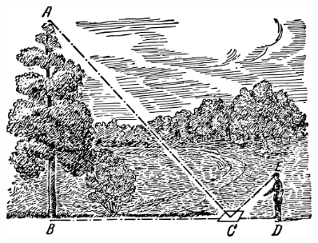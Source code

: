 \begin{figure}[h!]
\centering
\includegraphics[width=0.9\textwidth]{figures/ch-01/fig-01-14.pdf}
\end{figure}


